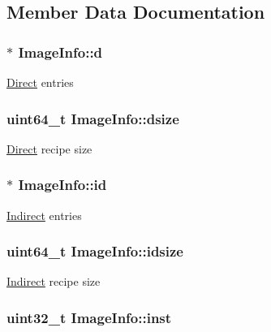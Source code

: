 \subsection{\-Member \-Data \-Documentation}
\hypertarget{structImageInfo_a5c9bdef21d950704e2953f115b9ddd08}{
\subsubsection[{d}]{$\ast$ {\bf \-Image\-Info\-::d}}}\label{structImageInfo_a5c9bdef21d950704e2953f115b9ddd08}
\hyperlink{structDirect}{\-Direct} entries \hypertarget{structImageInfo_ab66a6c455413448e3e6caf8364ea916f}{
\subsubsection[{dsize}]{\setlength{\rightskip}{0pt plus 5cm}uint64\-\_\-t {\bf \-Image\-Info\-::dsize}}}\label{structImageInfo_ab66a6c455413448e3e6caf8364ea916f}
\hyperlink{structDirect}{\-Direct} recipe size \hypertarget{structImageInfo_a7093240a7ad1869f0338bfe10e088e10}{
\subsubsection[{id}]{$\ast$ {\bf \-Image\-Info\-::id}}}\label{structImageInfo_a7093240a7ad1869f0338bfe10e088e10}
\hyperlink{structIndirect}{\-Indirect} entries \hypertarget{structImageInfo_ab79b5ded9de3743eca4eef16e926aca7}{
\subsubsection[{idsize}]{\setlength{\rightskip}{0pt plus 5cm}uint64\-\_\-t {\bf \-Image\-Info\-::idsize}}}\label{structImageInfo_ab79b5ded9de3743eca4eef16e926aca7}
\hyperlink{structIndirect}{\-Indirect} recipe size \hypertarget{structImageInfo_a5b94684351d07a24d15d50600dd10c40}{
\subsubsection[{inst}]{\setlength{\rightskip}{0pt plus 5cm}uint32\-\_\-t {\bf \-Image\-Info\-::inst}}}\label{structImageInfo_a5b94684351d07a24d15d50600dd10c40}
